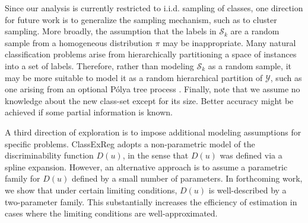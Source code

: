 \documentclass[twoside,11pt]{article}
\begin{document}
Since our analysis is currently restricted to i.i.d. sampling of classes,
one direction for future work is to generalize the sampling mechanism,
such as to cluster sampling.  More broadly, the assumption that the labels in $\mathcal{S}_k$ are a
random sample from a homogeneous distribution $\pi$ may be inappropriate.  Many
natural classification problems arise from hierarchically partitioning
a space of instances into a set of labels.  Therefore, rather than
modeling $\mathcal{S}_k$ as a random sample, it may be more suitable
to model it as a random hierarchical partition of $\mathcal{Y}$, such as one arising from an optional P{\'o}lya tree process
\citep{wong2010optional}.
Finally, note that we assume no knowledge about the new class-set
except for its size. Better accuracy might be achieved if some partial information
is known.




A third direction of exploration is to impose additional modeling assumptions for specific problems.  ClassExReg adopts a non-parametric model of the discriminability function $D(u)$, in the sense that $D(u)$ was defined via a spline expansion. However, an alternative approach is to assume a parametric family for $D(u)$ defined by a small number of parameters.  In forthcoming work, we show that under certain limiting conditions, $D(u)$ is well-described by a two-parameter family.  This substantially increases the efficiency of estimation in cases where the limiting conditions are well-approximated.






\end{document}
